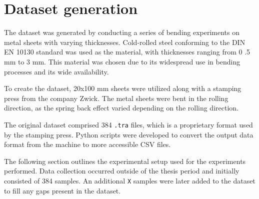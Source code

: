 \section{Dataset generation}\label{sec:dataset-generation}

The dataset was generated by conducting a series of bending experiments on metal sheets with varying thicknesses.
Cold-rolled steel conforming to the DIN EN 10130 standard was used as the material, with thicknesses ranging from 0
.5 mm to 3 mm.
This material was chosen due to its widespread use in bending processes and its wide availability.

To create the dataset, 20x100 mm sheets were utilized along with a stamping press from the company Zwick.
The metal sheets were bent in the rolling direction, as the spring back effect varied depending on the rolling
direction.

The original dataset comprised 384 \texttt{.tra} files, which is a proprietary format used by the stamping press.
Python scripts were developed to convert the output data format from the machine to more accessible CSV files.

The following section outlines the experimental setup used for the experiments performed.
Data collection occurred outside of the thesis period and initially consisted of 384 samples.
An additional \texttt{X} samples were later added to the dataset to fill any gaps present in the dataset.




